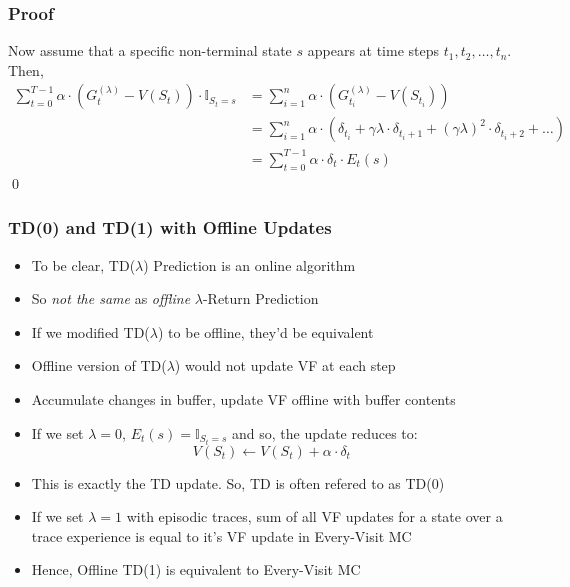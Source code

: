 \documentclass[handout]{beamer}
\begin{document}
\begin{frame}
\frametitle{Proof}
\pause
Now assume that a specific non-terminal state $s$ appears at time steps $t_1, t_2, \ldots, t_n$. Then,
\begin{align*}
\sum_{t=0}^{T-1} \alpha \cdot (G_t^{(\lambda)} - V(S_t)) \cdot \mathbb{I}_{S_t=s} & = \sum_{i=1}^n \alpha \cdot (G_{t_i}^{(\lambda)} - V(S_{t_i})) \\
& = \sum_{i=1}^n \alpha \cdot (\delta_{t_i} + \gamma \lambda \cdot \delta_{t_i+1} + (\gamma \lambda)^2 \cdot \delta_{t_i+2} + \ldots ) \\
& = \sum_{t=0}^{T-1} \alpha \cdot \delta_t \cdot E_t(s)
\end{align*}
\qed
\end{frame}


\begin{frame}
\frametitle{TD(0) and TD(1) with Offline Updates}
\pause
\begin{itemize}[<+->]
\item To be clear, TD($\lambda$) Prediction is an online algorithm
\item So {\em not the same} as {\em offline} $\lambda$-Return Prediction
\item If we modified TD($\lambda$) to be offline, they'd be equivalent
\item Offline version of TD($\lambda$) would not update VF at each step
\item Accumulate changes in buffer, update VF offline with buffer contents
\item If we set $\lambda = 0$, $E_t(s) = \mathbb{I}_{S_t=s}$ and so, the update reduces to:
$$V(S_t) \leftarrow V(S_t) + \alpha \cdot \delta_t$$
\item This is exactly the TD update. So, TD is often refered to as TD(0)
\item If we set $\lambda=1$ with episodic traces, sum of all VF updates for a state over a trace experience is equal to it's VF update in Every-Visit MC
\item Hence, Offline TD(1) is equivalent to Every-Visit MC
\end{itemize}
\end{frame}
\end{document}
